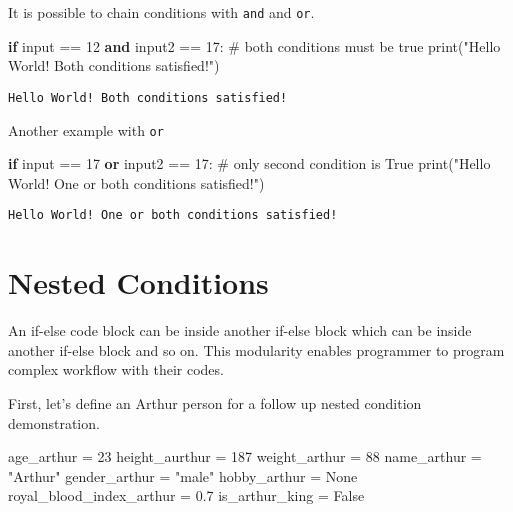 \documentclass[
  letterpaper,
  DIV=11,
  numbers=noendperiod]{scrreprt}
\newenvironment{Shaded}{\begin{snugshade}}{\end{snugshade}}
\newcommand{\BuiltInTok}[1]{\textcolor[rgb]{0.00,0.23,0.31}{#1}}
\newcommand{\CommentTok}[1]{\textcolor[rgb]{0.37,0.37,0.37}{#1}}
\newcommand{\ControlFlowTok}[1]{\textcolor[rgb]{0.00,0.23,0.31}{\textbf{#1}}}
\newcommand{\DecValTok}[1]{\textcolor[rgb]{0.68,0.00,0.00}{#1}}
\newcommand{\FloatTok}[1]{\textcolor[rgb]{0.68,0.00,0.00}{#1}}
\newcommand{\KeywordTok}[1]{\textcolor[rgb]{0.00,0.23,0.31}{\textbf{#1}}}
\newcommand{\NormalTok}[1]{\textcolor[rgb]{0.00,0.23,0.31}{#1}}
\newcommand{\OperatorTok}[1]{\textcolor[rgb]{0.37,0.37,0.37}{#1}}
\newcommand{\StringTok}[1]{\textcolor[rgb]{0.13,0.47,0.30}{#1}}
\newcommand{\VariableTok}[1]{\textcolor[rgb]{0.07,0.07,0.07}{#1}}
\begin{document}
It is possible to chain conditions with \texttt{and} and \texttt{or}.

\begin{Shaded}
\begin{Highlighting}[]
\ControlFlowTok{if} \BuiltInTok{input} \OperatorTok{==} \DecValTok{12} \KeywordTok{and}\NormalTok{ input2 }\OperatorTok{==} \DecValTok{17}\NormalTok{: }\CommentTok{\# both conditions must be true}
    \BuiltInTok{print}\NormalTok{(}\StringTok{"Hello World! Both conditions satisfied!"}\NormalTok{)}
\end{Highlighting}
\end{Shaded}

\begin{verbatim}
Hello World! Both conditions satisfied!
\end{verbatim}

Another example with \texttt{or}

\begin{Shaded}
\begin{Highlighting}[]
\ControlFlowTok{if} \BuiltInTok{input} \OperatorTok{==} \DecValTok{17} \KeywordTok{or}\NormalTok{ input2 }\OperatorTok{==} \DecValTok{17}\NormalTok{: }\CommentTok{\# only second condition is True}
    \BuiltInTok{print}\NormalTok{(}\StringTok{"Hello World! One or both conditions satisfied!"}\NormalTok{)}
\end{Highlighting}
\end{Shaded}

\begin{verbatim}
Hello World! One or both conditions satisfied!
\end{verbatim}

\section{Nested Conditions}\label{nested-conditions}

An if-else code block can be inside another if-else block which can be
inside another if-else block and so on. This modularity enables
programmer to program complex workflow with their codes.

First, let's define an Arthur person for a follow up nested condition
demonstration.

\begin{Shaded}
\begin{Highlighting}[]
\NormalTok{age\_arthur }\OperatorTok{=} \DecValTok{23}
\NormalTok{height\_aurthur }\OperatorTok{=} \DecValTok{187}
\NormalTok{weight\_arthur }\OperatorTok{=} \DecValTok{88}
\NormalTok{name\_arthur }\OperatorTok{=} \StringTok{"Arthur"}
\NormalTok{gender\_arthur }\OperatorTok{=} \StringTok{"male"}
\NormalTok{hobby\_arthur }\OperatorTok{=} \VariableTok{None}
\NormalTok{royal\_blood\_index\_arthur }\OperatorTok{=} \FloatTok{0.7}
\NormalTok{is\_arthur\_king }\OperatorTok{=} \VariableTok{False}
\end{Highlighting}
\end{Shaded}
\end{document}
